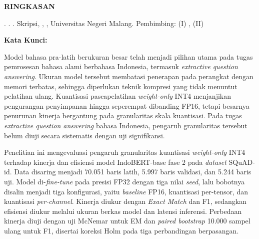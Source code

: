 %
%

\clearpage
{}

\begin{center}
    \bfseries RINGKASAN
\end{center}

\begin{singlespace}

\noindent \penulis. \bulantahun. \textit{\judul}. Skripsi, \departemen, \fakultas, Universitas Negeri Malang. Pembimbing: (I) \pembimbingSatu\ifx\pembimbingDua\empty\else, (II) \pembimbingDua\fi

\vspace{0.5\baselineskip}
\noindent \textbf{Kata Kunci:} \katakunci%

\vspace{\baselineskip}

Model bahasa pra-latih berukuran besar telah menjadi pilihan utama pada tugas pemrosesan bahasa alami berbahasa Indonesia, termasuk \textit{extractive question answering}. Ukuran model tersebut membatasi penerapan pada perangkat dengan memori terbatas, sehingga diperlukan teknik kompresi yang tidak menuntut pelatihan ulang. Kuantisasi pascapelatihan \textit{weight-only} INT4 menjanjikan pengurangan penyimpanan hingga seperempat dibanding FP16, tetapi besarnya penurunan kinerja bergantung pada granularitas skala kuantisasi. Pada tugas \textit{extractive question answering} bahasa Indonesia, pengaruh granularitas tersebut belum diuji secara sistematis dengan uji signifikansi.

Penelitian ini mengevaluasi pengaruh granularitas kuantisasi \textit{weight-only} INT4 terhadap kinerja dan efisiensi model IndoBERT-base fase 2 pada \textit{dataset} SQuAD-id. Data disaring menjadi 70.051 baris latih, 5.997 baris validasi, dan 5.244 baris uji. Model di-\textit{fine-tune} pada presisi FP32 dengan tiga nilai \textit{seed}, lalu bobotnya disalin menjadi tiga konfigurasi, yaitu \textit{baseline} FP16, kuantisasi per-tensor, dan kuantisasi \textit{per-channel}. Kinerja diukur dengan \textit{Exact Match} dan F1, sedangkan efisiensi diukur melalui ukuran berkas model dan latensi inferensi. Perbedaan kinerja diuji dengan uji McNemar untuk EM dan \textit{paired bootstrap} 10.000 sampel ulang untuk F1, disertai koreksi Holm pada tiga perbandingan berpasangan.


\end{singlespace}
